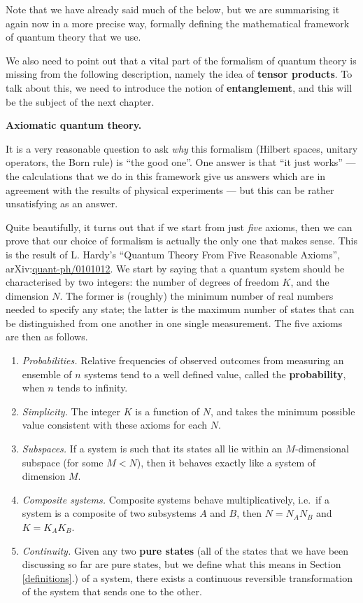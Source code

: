 \documentclass[fleqn,a4paper]{article}
\providecommand{\tightlist}{\setlength{\itemsep}{0pt}\setlength{\parskip}{0pt}}
\newenvironment{technical}[1]{\textbf{#1.}\par\vspace{.5\baselineskip}\everypar{\setlength{\parindent}{1.5em}}}{}
\theoremstyle{definition}
\theoremstyle{definition}
\theoremstyle{definition}
\theoremstyle{definition}
\theoremstyle{remark}
\begin{document}
Note that we have already said much of the below, but we are summarising it again now in a more precise way, formally defining the mathematical framework of quantum theory that we use.

We also need to point out that a vital part of the formalism of quantum theory is missing from the following description, namely the idea of \textbf{tensor products}.
To talk about this, we need to introduce the notion of \textbf{entanglement}, and this will be the subject of the next chapter.

\begin{technical}{Axiomatic quantum theory}
It is a very reasonable question to ask \emph{why} this formalism (Hilbert spaces, unitary operators, the Born rule) is ``the good one''.
One answer is that ``it just works'' --- the calculations that we do in this framework give us answers which are in agreement with the results of physical experiments --- but this can be rather unsatisfying as an answer.

Quite beautifully, it turns out that if we start from just \emph{five} axioms, then we can prove that our choice of formalism is actually the only one that makes sense.
This is the result of L. Hardy's ``Quantum Theory From Five Reasonable Axioms'', arXiv:\href{https://arxiv.org/abs/quant-ph/0101012}{quant-ph/0101012}.
We start by saying that a quantum system should be characterised by two integers: the number of degrees of freedom \(K\), and the dimension \(N\).
The former is (roughly) the minimum number of real numbers needed to specify any state; the latter is the maximum number of states that can be distinguished from one another in one single measurement.
The five axioms are then as follows.

\begin{enumerate}
\def\labelenumi{\arabic{enumi}.}
\tightlist
\item
  \emph{Probabilities.} Relative frequencies of observed outcomes from measuring an ensemble of \(n\) systems tend to a well defined value, called the \textbf{probability}, when \(n\) tends to infinity.
\item
  \emph{Simplicity.} The integer \(K\) is a function of \(N\), and takes the minimum possible value consistent with these axioms for each \(N\).
\item
  \emph{Subspaces.} If a system is such that its states all lie within an \(M\)-dimensional subspace (for some \(M<N\)), then it behaves exactly like a system of dimension \(M\).
\item
  \emph{Composite systems.} Composite systems behave multiplicatively, i.e.~if a system is a composite of two subsystems \(A\) and \(B\), then \(N=N_AN_B\) and \(K=K_AK_B\).
\item
  \emph{Continuity.} Given any two \textbf{pure states} (all of the states that we have been discussing so far are pure states, but we define what this means in Section \ref{definitions}.) of a system, there exists a continuous reversible transformation of the system that sends one to the other.
\end{enumerate}


\end{technical}
\end{document}
